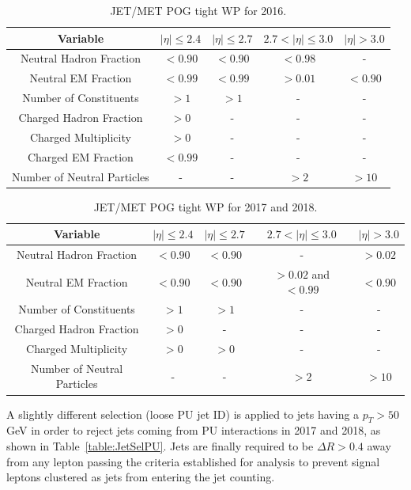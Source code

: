 \documentclass[a4paper, 10pt, openright]{report}
\begin{document}
\begin{table}
\begin{center}
\begin{tabular}{ c|c|c|c|c } 
 \hline
 Variable & $|\eta| \leq 2.4$ & $|\eta| \leq 2.7$ & $2.7 < |\eta| \leq 3.0$ & $|\eta| > 3.0$ \\
\hline
Neutral Hadron Fraction & $< 0.90$ & $< 0.90$ & $< 0.98$ & - \\
Neutral EM Fraction & $< 0.99$ & $< 0.99$ & $> 0.01$ & $< 0.90$ \\ 
Number of Constituents & $> 1$ & $> 1$ & - & - \\
Charged Hadron Fraction & $> 0$ & - & - & - \\
Charged Multiplicity & $> 0$ & - & - & - \\
Charged EM Fraction & $< 0.99$ & - & - & - \\
Number of Neutral Particles	 & - & - & $> 2$ & $> 10$ \\
\hline
\end{tabular}
\caption{JET/MET \ac{POG} tight \ac{WP} for 2016.}
\label{table:JetID2016}
\end{center}
\end{table}

\begin{table}
\begin{center}
\begin{tabular}{ c|c|c|c|c } 
 \hline
 Variable & $|\eta| \leq 2.4$ & $|\eta| \leq 2.7$ & $2.7 < |\eta| \leq 3.0$ & $|\eta| > 3.0$ \\
\hline
Neutral Hadron Fraction & $< 0.90$ & $< 0.90$ & - & $> 0.02$ \\
Neutral EM Fraction & $< 0.90$ & $< 0.90$ & $> 0.02$ and $<0.99$ & $< 0.90$ \\
Number of Constituents & $> 1$ & $> 1$ & - & - \\
Charged Hadron Fraction & $> 0$ & - & - & - \\
Charged Multiplicity & $> 0$ & $> 0$ & - & - \\
Number of Neutral Particles & - & - & $> 2$ & $> 10$ \\
\hline
\end{tabular}
\caption{JET/MET \ac{POG} tight \ac{WP} for 2017 and 2018.}
\label{table:JetID2017}
\end{center}
\end{table}

A slightly different selection (loose \ac{PU} jet ID) is applied to jets having a $p_T > 50$ GeV in order to reject jets coming from \ac{PU} interactions in 2017 and 2018, as shown in Table~\ref{table:JetSelPU}. Jets are finally required to be $\Delta R > 0.4$ away from any lepton passing the criteria established for analysis to prevent signal leptons clustered as jets from entering the jet counting.
\end{document}
